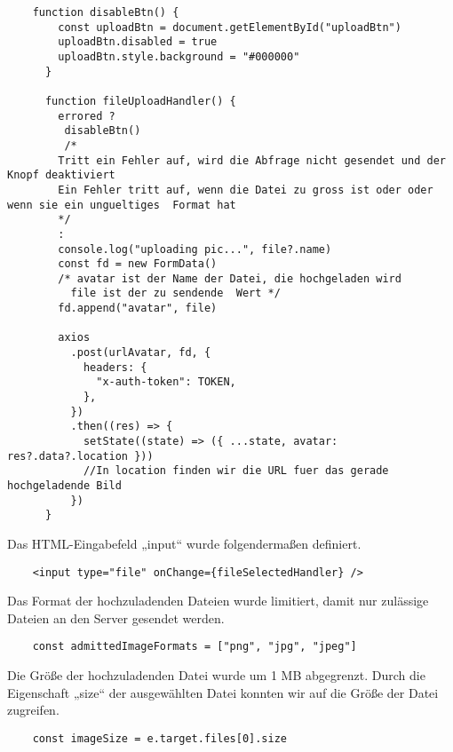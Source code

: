 \begin{lstlisting}
    function disableBtn() {
        const uploadBtn = document.getElementById("uploadBtn")
        uploadBtn.disabled = true
        uploadBtn.style.background = "#000000"
      }
    
      function fileUploadHandler() {
        errored ? 
         disableBtn()
         /*
        Tritt ein Fehler auf, wird die Abfrage nicht gesendet und der Knopf deaktiviert 
        Ein Fehler tritt auf, wenn die Datei zu gross ist oder oder wenn sie ein ungueltiges  Format hat
        */
        :
        console.log("uploading pic...", file?.name)
        const fd = new FormData()
        /* avatar ist der Name der Datei, die hochgeladen wird
          file ist der zu sendende  Wert */
        fd.append("avatar", file)  
    
        axios
          .post(urlAvatar, fd, {
            headers: {
              "x-auth-token": TOKEN,
            },
          })
          .then((res) => {
            setState((state) => ({ ...state, avatar: res?.data?.location }))    
            //In location finden wir die URL fuer das gerade hochgeladende Bild 
          })
      }\end{lstlisting}

Das HTML-Eingabefeld „input“ wurde folgendermaßen definiert.
\begin{lstlisting}
    <input type="file" onChange={fileSelectedHandler} />
\end{lstlisting}


Das Format der hochzuladenden Dateien wurde limitiert, damit nur zulässige Dateien an den Server gesendet werden.
\begin{lstlisting}
    const admittedImageFormats = ["png", "jpg", "jpeg"]
\end{lstlisting}

Die Größe der hochzuladenden Datei wurde um 1 MB abgegrenzt.
Durch die Eigenschaft „size“ der ausgewählten Datei konnten wir auf die Größe der Datei zugreifen.
\begin{lstlisting}
    const imageSize = e.target.files[0].size
\end{lstlisting}